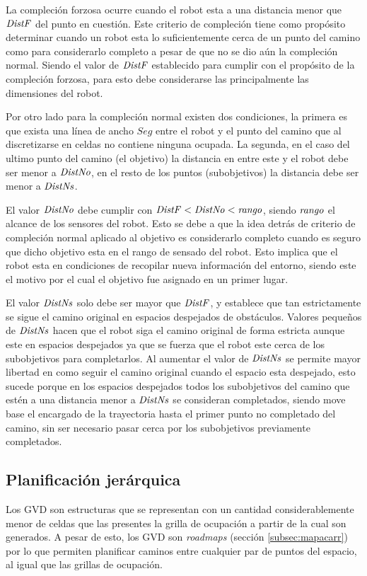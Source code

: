 La compleción forzosa ocurre cuando el robot esta a una distancia menor que
$\mathit{DistF}$ del punto en cuestión. Este criterio de compleción tiene como
propósito determinar cuando un robot esta lo suficientemente cerca de un
punto del camino como para considerarlo completo a pesar de que no se dio
aún la compleción normal. Siendo el valor de $\mathit{DistF}$ establecido para
cumplir con el propósito de la compleción forzosa, para esto debe considerarse
las principalmente las dimensiones del robot.

Por otro lado para la compleción normal existen dos condiciones, la primera es
que exista una línea de ancho $Seg$ entre el robot y el punto del camino que al
discretizarse en celdas no contiene ninguna ocupada. La segunda, en el caso del
ultimo punto del camino (el objetivo) la distancia en entre este y el robot
debe ser menor a $\mathit{DistNo}$, en el resto de los puntos (subobjetivos) la distancia debe
ser menor a $\mathit{DistNs}$.

El valor $\mathit{DistNo}$ debe cumplir con
$\mathit{DistF}<\mathit{DistNo}<\mathit{rango}$, siendo $\mathit{rango}$ el alcance de los
sensores del robot. Esto se debe a que la idea detrás de criterio de compleción
normal aplicado al objetivo es considerarlo completo cuando es seguro que dicho objetivo
esta en el rango de sensado del robot. Esto implica que el robot esta en
condiciones de recopilar nueva información del entorno, siendo este el motivo
por el cual el objetivo fue asignado en un primer lugar.

El valor $\mathit{DistNs}$ solo debe ser mayor que $\mathit{DistF}$, y establece que
tan estrictamente se sigue el camino original en espacios despejados de
obstáculos. Valores pequeños de $\mathit{DistNs}$ hacen que el robot siga el
camino original de forma estricta aunque este en espacios despejados ya que se 
fuerza que el robot este cerca de los subobjetivos para completarlos. Al
aumentar el valor de $\mathit{DistNs}$ se permite mayor libertad en como seguir el
camino original cuando el espacio esta despejado, esto sucede porque en los
espacios despejados todos los subobjetivos del camino que estén a una
distancia menor a $\mathit{DistNs}$ se consideran completados, siendo move base el
encargado de la trayectoria hasta el primer punto no completado del camino,
sin ser necesario pasar cerca por los subobjetivos previamente completados.

\subsection{Planificación jerárquica}
Los GVD son estructuras que se representan con un cantidad considerablemente
menor de celdas que las presentes la grilla de ocupación a partir de la cual son
generados. A pesar de esto, los GVD son \emph{roadmaps} (sección
\ref{subsec:mapacarr}) por lo que permiten planificar caminos entre cualquier par de
puntos del espacio, al igual que las grillas de ocupación. 

